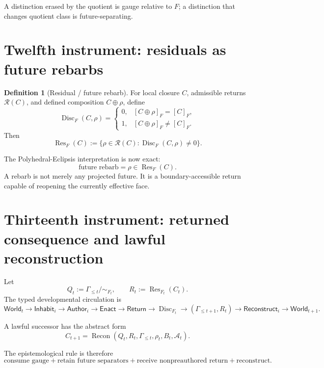 \documentclass[10pt]{article}
\theoremstyle{pe}
\theoremstyle{definition}
\newtheorem{definition}[theorem]{Definition}
\newcommand{\Disc}{\operatorname{Disc}}
\newcommand{\Res}{\operatorname{Res}}
\newcommand{\Recon}{\operatorname{Recon}}
\newcommand{\World}{\mathsf{World}}
\newcommand{\Return}{\mathsf{Return}}
\begin{document}
A distinction erased by the quotient is gauge relative to \(F\); a distinction that changes quotient class is future-separating.

\section{Twelfth instrument: residuals as future rebarbs}

\begin{definition}[Residual / future rebarb]
For local closure \(C\), admissible returns \(\mathcal R(C)\), and defined composition \(C\oplus\rho\), define
\[
  \Disc_F(C,\rho)
  =
  \begin{cases}
    0,&[C\oplus\rho]_F=[C]_F,\\
    1,&[C\oplus\rho]_F\neq[C]_F.
  \end{cases}
\]
Then
\begin{equation}\label{eq:residual}
  \Res_F(C)
  :=
  \{\rho\in\mathcal R(C):\Disc_F(C,\rho)\neq0\}.
\end{equation}
\end{definition}

The Polyhedral-Eclipsis interpretation is now exact:
\[
  \boxed{
  \text{future rebarb}
  =
  \rho\in\Res_F(C).
  }
\]
A rebarb is not merely any projected future.  It is a boundary-accessible return capable of reopening the currently effective face.

\section{Thirteenth instrument: returned consequence and lawful reconstruction}

Let
\[
  Q_t:=\Gamma_{\le t}/\!\sim_{F_t},
  \qquad
  R_t:=\Res_{F_t}(C_t).
\]
The typed developmental circulation is
\begin{equation}\label{eq:ctl-cycle}
  \World_t
  \to
  \mathsf{Inhabit}_i
  \to
  \mathsf{Author}_i
  \to
  \mathsf{Enact}
  \to
  \Return
  \to
  \Disc_{F_t}
  \to
  (\Gamma_{\le t+1},R_t)
  \to
  \mathsf{Reconstruct}_i
  \to
  \World_{t+1}.
\end{equation}

A lawful successor has the abstract form
\begin{equation}\label{eq:successor}
  C_{t+1}
  =
  \Recon(Q_t,R_t,\Gamma_{\le t},\rho_t,B_t,\mathcal A_t).
\end{equation}

The epistemological rule is therefore
\[
  \boxed{
  \text{consume gauge}
  +
  \text{retain future separators}
  +
  \text{receive nonpreauthored return}
  +
  \text{reconstruct}.
  }
\]
\end{document}
